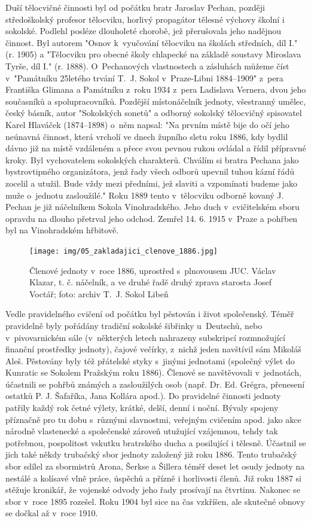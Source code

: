 \documentclass[a5paper, 11pt, twoside]{article}
\begin{document}
Duší tělocvičné činnosti byl od počátku bratr Jaroslav Pechan, později středoškolský profesor tělocviku, horlivý propagátor tělesné výchovy školní i sokolské. Podlehl posléze dlouholeté chorobě, jež přerušovala jeho nadějnou činnost. Byl autorem "Osnov k~vyučování tělocviku na školách středních, díl I." (r. 1905) a "Tělocviku pro obecné školy chlapecké na základě soustavy Miroslava Tyrše, díl I." (r. 1888). O~Pechanových vlastnostech a zásluhách můžeme číst v~"Památníku 25letého trvání T.~J.  Sokol v~Praze-Libni 1884–⁠⁠⁠⁠⁠⁠1909" z~pera Františka Glimana a Památníku z~roku 1934 z~pera Ladislava Vernera, dvou jeho současníků a spolupracovníků. Pozdější místonáčelník jednoty, všestranný umělec, český básník, autor "Sokolských sonetů" a odborný sokolský tělocvičný spisovatel Karel Hlaváček (1874–1898) o~něm napsal: "Na prvním místě bije do očí jeho neúnavná činnost, která vrcholí ve dnech župního sletu roku 1886, kdy bydlil dávno již na místě vzdáleném a přece svou pevnou rukou ovládal a řídil přípravné kroky. Byl vychovatelem sokolských  charakterů.  Chválím si bratra Pechana jako bystrovtipného organizátora, jenž řady všech odborů upevnil tuhou kázní řádů zocelil a utužil. Bude vždy mezi předními, jež slaviti a vzpomínati budeme jako muže o~jednotu zasloužilé." Roku 1889 tento v~tělocviku odborně kovaný J. Pechan je již náčelníkem Sokola Vinohradského. Jeho duch v~cvičitelském sboru opravdu na dlouho přetrval jeho odchod. Zemřel 14. 6. 1915 v~Praze a pohřben byl na Vinohradském hřbitově.

\begin{figure}[h!]
  \centering
   \texttt{[image: img/05\_zakladajici\_clenove\_1886.jpg]}
  \caption*{Členové jednoty v~roce 1886, uprostřed s~plnovousem JUC. Václav Klazar, t. č. náčelník, a ve druhé řadě druhý zprava starosta Josef Voctář; foto: archiv T.~J. Sokol Libeň}
\end{figure}

Vedle pravidelného cvičení od počátku byl pěstován i život společenský. Téměř pravidelně byly pořádány tradiční sokolské šibřinky u~Deutschů, nebo v~pivovarnickém sále (v~některých letech nahrazeny subskripcí rozmnožující finanční prostředky jednoty), čajové večírky, z~nichž jeden navštívil sám Mikoláš Aleš. Pěstovány byly též přátelské styky s~jinými jednotami (společný výlet do Kunratic se Sokolem Pražským roku 1886). Členové se navštěvovali v~jednotách, účastnili se pohřbů známých a zasloužilých osob (např. Dr. Ed. Grégra, přenesení ostatků P. J. Šafaříka, Jana Kollára apod.). Do pravidelné činnosti jednoty patřily každý rok četné výlety, krátké, delší, denní i noční. Bývaly spojeny příznačně pro tu dobu s~různými slavnostmi, veřejným cvičením apod. jako akce národně vlastenecké a společenské zároveň utužující vzájemnou, tehdy tak potřebnou, pospolitost vskutku bratrského ducha a posilující i tělesně. Účastnil se jich také někdy trubačský sbor jednoty založený již roku 1886. Tento trubačský sbor sdílel za sbormistrů Arona, Šerkse a Šillera téměř deset let osudy jednoty na nestálé a kolísavé vlně práce, úspěchů a přízně i horlivosti členů. Již roku 1887 si stěžuje kronikář, že vojenské odvody jeho řady prosívají na čtvrtinu. Nakonec se sbor v~roce 1895 rozešel. Roku 1904 byl sice na čas vzkříšen, ale skutečné obnovy se dočkal až v~roce 1910.
\end{document}
